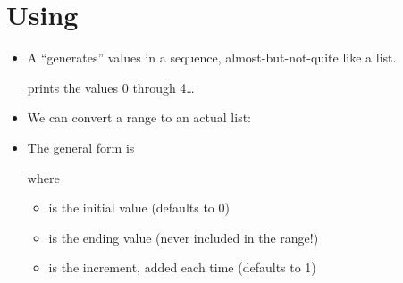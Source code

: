 \documentclass[letterpaper,10pt,english]{sphinxmanual}
\begin{document}
\section{Using }
\label{\detokenize{lecture_notes/lec10_lists2:using-range}}\begin{itemize}
\item {} 
A  “generates” values in a sequence, almost-but-not-quite
like a list.

%
\begin{sphinxVerbatim}[commandchars=\\\{\}]
   
\end{sphinxVerbatim}

prints the values 0 through 4…

\item {} 
We can convert a range to an actual list:

%
\begin{sphinxVerbatim}[commandchars=\\\{\}]
  
\end{sphinxVerbatim}

\item {} 
The general form is

%
\begin{sphinxVerbatim}[commandchars=\\\{\}]
    
\end{sphinxVerbatim}

where
\begin{itemize}
\item {} 
 is the initial value (defaults to 0)

\item {} 
 is the ending value (never included in the range!)

\item {} 
 is the increment, added each time (defaults to 1)


\end{itemize}
\end{itemize}
\end{document}
